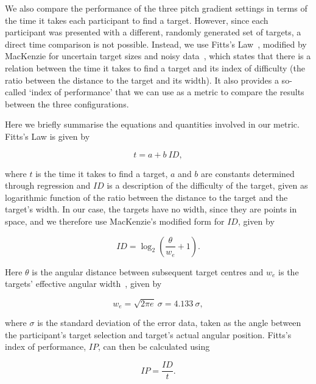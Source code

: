 \documentclass[]{interact}
\begin{document}
We also compare the performance of the three pitch gradient settings in terms of the time it takes each participant to find a target.
However, since each participant was presented with a different, randomly generated set of targets, a direct time comparison is not possible.
Instead, we use Fitts's Law~\citep{fitts1954information}, modified by MacKenzie for uncertain target sizes and noisy data~\citep{mackenzie1992fitts}, which states that there is a relation between the time it takes to find a target and its index of difficulty (the ratio between the distance to the target and its width).
It also provides a so-called `index of performance' that we can use as a metric to compare the results between the three configurations. 

Here we briefly summarise the equations and quantities involved in our metric.
Fitts's Law is given by  

\begin{equation}
  \label{eq:fitts-base}
  t = a + b~ID,
\end{equation}

\noindent
where $t$ is the time it takes to find a target, $a$ and $b$ are constants determined through regression and $ID$ is a description of the difficulty of the target, given as logarithmic function of the ratio between the distance to the target and the target's width.
In our case, the targets have no width, since they are points in space, and we therefore use MacKenzie's modified form for $ID$, given by

\begin{equation}
  \label{eq:fitts-id}
  ID = \log_2\left(\frac{\theta}{w_e} + 1\right).
\end{equation}

\noindent
Here $\theta$ is the angular distance between subsequent target centres and $w_e$ is the targets' effective angular width~\citep{welford1968fundamentals}, given by

\begin{equation}
  \label{eq:fitts-we}
  w_e = \sqrt{2\pi e}~\sigma = 4.133~\sigma,
\end{equation}

\noindent
where $\sigma$ is the standard deviation of the error data, taken as the angle between the participant's target selection and target's actual angular position.
Fitts's index of performance, $IP$, can then be calculated using 

\begin{equation}
  \label{eq:fitts-performance}
  IP = \frac{ID}{t}.
\end{equation}
\end{document}
